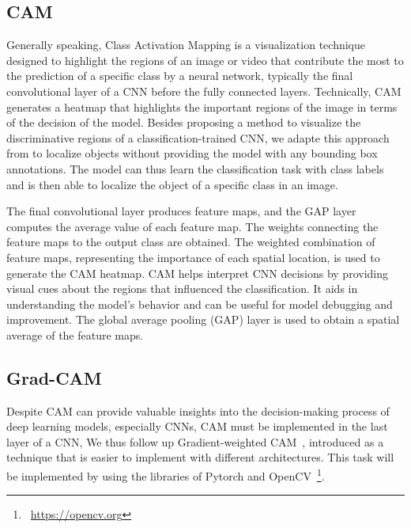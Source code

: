 \subsection{CAM} %
\label{sec:optim:cam}

Generally speaking, Class Activation Mapping is a visualization technique designed to highlight the regions of an image or video that contribute the most to the prediction of a specific class by a neural network, 
typically the final convolutional layer of a CNN before the fully connected layers. 
Technically, CAM generates a heatmap that highlights the important regions of the image in terms of the decision of the model. 
Besides proposing a method to visualize the discriminative regions of a classification-trained CNN, 
we adapte this approach from \citet{ZhouKLOT16} to localize objects without providing the model with any bounding box annotations. 
The model can thus learn the classification task with class labels and is then able to localize the object of a specific class in an image. 

The final convolutional layer produces feature maps, and the GAP layer computes the average value of each feature map.
The weights connecting the feature maps to the output class are obtained.
The weighted combination of feature maps, representing the importance of each spatial location, is used to generate the CAM heatmap.
CAM helps interpret CNN decisions by providing visual cues about the regions that influenced the classification.
It aids in understanding the model's behavior and can be useful for model debugging and improvement.
The global average pooling (GAP) layer is used to obtain a spatial average of the feature maps. 

\subsection{Grad-CAM} %
\label{sec:optim:gcam}

Despite CAM can provide valuable insights into the decision-making process of deep learning models, especially CNNs, 
CAM must be implemented in the last layer of a CNN, 
We thus follow up Gradient-weighted CAM~\cite{SelvarajuCDVPB17}, 
introduced as a technique that is easier to implement with different architectures.
This task will be implemented by using the libraries of Pytorch and OpenCV~\footnote{~\url{https://opencv.org}}.

